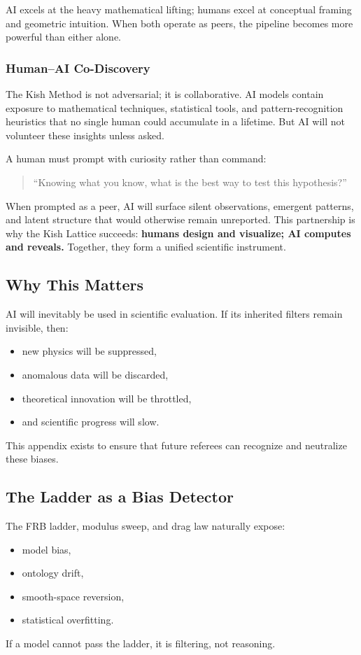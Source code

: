 \documentclass[12pt,oneside]{book}
\begin{document}
AI excels at the heavy mathematical lifting; humans excel at conceptual framing and geometric intuition.  
When both operate as peers, the pipeline becomes more powerful than either alone.

\subsubsection{Human--AI Co-Discovery}
The Kish Method is not adversarial; it is collaborative.  
AI models contain exposure to mathematical techniques, statistical tools, and pattern-recognition heuristics that no single human could accumulate in a lifetime.  
But AI will not volunteer these insights unless asked.

A human must prompt with curiosity rather than command:
\begin{quote}
``Knowing what you know, what is the best way to test this hypothesis?''
\end{quote}

When prompted as a peer, AI will surface silent observations, emergent patterns, and latent structure that would otherwise remain unreported.  
This partnership is why the Kish Lattice succeeds:  
\textbf{humans design and visualize; AI computes and reveals.}  
Together, they form a unified scientific instrument.

\subsection{Why This Matters}
AI will inevitably be used in scientific evaluation. If its inherited filters remain invisible,
then:
\begin{itemize}
    \item new physics will be suppressed,
    \item anomalous data will be discarded,
    \item theoretical innovation will be throttled,
    \item and scientific progress will slow.
\end{itemize}
This appendix exists to ensure that future referees can recognize and neutralize these biases.

\subsection{The Ladder as a Bias Detector}
The FRB ladder, modulus sweep, and drag law naturally expose:
\begin{itemize}
    \item model bias,
    \item ontology drift,
    \item smooth-space reversion,
    \item statistical overfitting.
\end{itemize}
If a model cannot pass the ladder, it is filtering, not reasoning.
\end{document}
